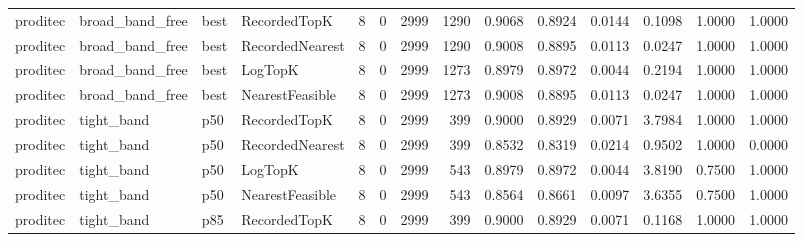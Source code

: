 \begin{tabular}{llllrrrrrrrrrr}
proditec &      broad\_band\_free &   best &    RecordedTopK &           8 &          0 &           2999 &                1290 &         0.9068 &          0.8924 &                    0.0144 &         0.1098 &                 1.0000 &                  1.0000 \\
proditec &      broad\_band\_free &   best & RecordedNearest &           8 &          0 &           2999 &                1290 &         0.9008 &          0.8895 &                    0.0113 &         0.0247 &                 1.0000 &                  1.0000 \\
proditec &      broad\_band\_free &   best &         LogTopK &           8 &          0 &           2999 &                1273 &         0.8979 &          0.8972 &                    0.0044 &         0.2194 &                 1.0000 &                  1.0000 \\
proditec &      broad\_band\_free &   best & NearestFeasible &           8 &          0 &           2999 &                1273 &         0.9008 &          0.8895 &                    0.0113 &         0.0247 &                 1.0000 &                  1.0000 \\
proditec &           tight\_band &    p50 &    RecordedTopK &           8 &          0 &           2999 &                 399 &         0.9000 &          0.8929 &                    0.0071 &         3.7984 &                 1.0000 &                  1.0000 \\
proditec &           tight\_band &    p50 & RecordedNearest &           8 &          0 &           2999 &                 399 &         0.8532 &          0.8319 &                    0.0214 &         0.9502 &                 1.0000 &                  0.0000 \\
proditec &           tight\_band &    p50 &         LogTopK &           8 &          0 &           2999 &                 543 &         0.8979 &          0.8972 &                    0.0044 &         3.8190 &                 0.7500 &                  1.0000 \\
proditec &           tight\_band &    p50 & NearestFeasible &           8 &          0 &           2999 &                 543 &         0.8564 &          0.8661 &                    0.0097 &         3.6355 &                 0.7500 &                  1.0000 \\
proditec &           tight\_band &    p85 &    RecordedTopK &           8 &          0 &           2999 &                 399 &         0.9000 &          0.8929 &                    0.0071 &         0.1168 &                 1.0000 &                  1.0000 \\

\end{tabular}

